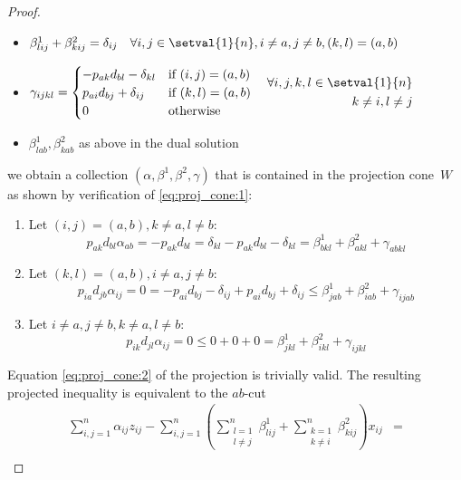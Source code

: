 \begin{proof}
\begin{itemize}
		\item $\beta^1_{lij} + \beta^2_{kij} = \delta_{ij}\quad\forall i,j\in\setval{1}{n}, i\neq a, j\neq b, (k,l) = (a,b)$
		\item $\gamma_{ijkl} = 
			\begin{cases}
				-p_{ak}d_{bl} - \delta_{kl}&\text{if }(i,j) = (a,b)\\
				p_{ai}d_{bj} + \delta_{ij}&\text{if }(k,l) = (a,b)\\
				0&\text{otherwise}
			\end{cases}
			\quad
			\begin{aligned}
				\forall i,j,k,l\in\setval{1}{n}\\
				k\neq i, l\neq j
			\end{aligned}
			$
		\item $\beta^1_{lab}, \beta^2_{kab}$ as above in the dual solution
	\end{itemize}
	we obtain a collection $(\alpha,\beta^1,\beta^2,\gamma)$ that is contained in the projection cone~$W$ as shown by verification of \eqref{eq:proj_cone:1}:
	\begin{enumerate}
		\item Let $(i,j)=(a,b), k\neq a, l\neq b$:
			\begin{equation*}
				p_{ak}d_{bl}\alpha_{ab} = -p_{ak}d_{bl} = \delta_{kl} -p_{ak}d_{bl} - \delta_{kl} = \beta^1_{bkl} + \beta^2_{akl} + \gamma_{abkl}
			\end{equation*}
		\item Let $(k,l) = (a,b), i\neq a, j\neq b$:
			\begin{equation*}
				p_{ia}d_{jb}\alpha_{ij} = 0 = -p_{ai}d_{bj} - \delta_{ij} + p_{ai}d_{bj} + \delta_{ij} \leq \beta^1_{jab} + \beta^2_{iab} + \gamma_{ijab}
			\end{equation*}
		\item Let $i\neq a, j\neq b, k\neq a, l\neq b$:
			\begin{equation*}
				p_{ik}d_{jl}\alpha_{ij} = 0 \leq 0 + 0 + 0 = \beta^1_{jkl} + \beta^2_{ikl} + \gamma_{ijkl}
			\end{equation*}
	\end{enumerate}
	Equation \eqref{eq:proj_cone:2} of the projection is trivially valid. The resulting projected inequality is equivalent to the $ab$-cut
	\begin{align*}
		\sum_{i,j=1}^n\alpha_{ij}z_{ij} - \sum_{i,j=1}^n \left(\sum_{\substack{l=1\\l\neq j}}^n \beta^1_{lij} + \sum_{\substack{k=1\\k\neq i}}^n\beta^2_{kij}\right)x_{ij} & =\\

\end{align*}
\end{proof}

